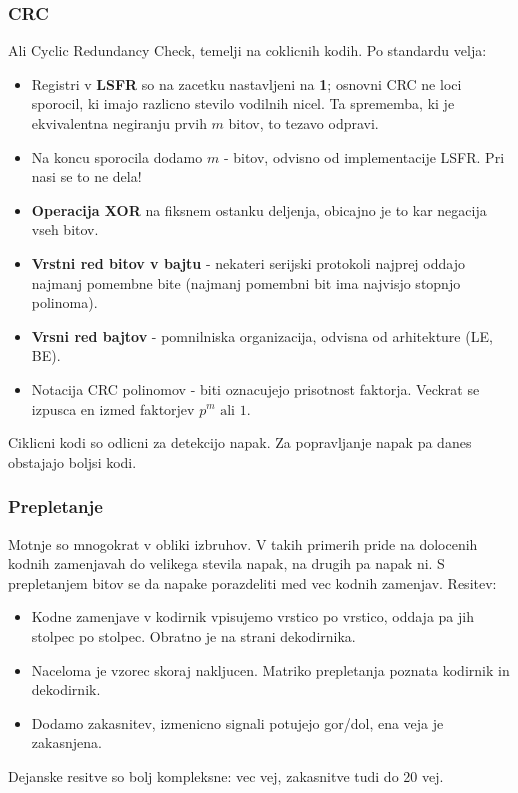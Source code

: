 \documentclass{article}
\begin{document}
\begin{multicols}{2}
	\subsubsection{CRC}
	Ali Cyclic Redundancy Check, temelji na coklicnih kodih.
	Po standardu velja:
	\begin{itemize}
		\item Registri v \textbf{LSFR} so na zacetku nastavljeni na \textbf{1}; osnovni CRC ne loci sporocil,
		      ki imajo razlicno stevilo vodilnih nicel. Ta sprememba, ki je ekvivalentna negiranju prvih $m$ bitov,
		      to tezavo odpravi.
		\item Na koncu sporocila dodamo $m$ - bitov, odvisno od implementacije LSFR. Pri nasi se to ne dela!
		\item \textbf{Operacija XOR} na fiksnem ostanku deljenja, obicajno je to kar negacija vseh bitov.
		\item \textbf{Vrstni red bitov v bajtu} - nekateri serijski protokoli najprej oddajo najmanj pomembne bite
		      (najmanj pomembni bit ima najvisjo stopnjo polinoma).
		\item \textbf{Vrsni red bajtov} - pomnilniska organizacija, odvisna od arhitekture (LE, BE).
		\item Notacija CRC polinomov - biti oznacujejo prisotnost faktorja. Veckrat se izpusca en izmed faktorjev $p^m \text{ ali } 1$.
	\end{itemize}
	Ciklicni kodi so odlicni za detekcijo napak. Za popravljanje napak pa danes obstajajo boljsi kodi.

	\subsubsection{Prepletanje}
	Motnje so mnogokrat v obliki izbruhov. V takih primerih pride na dolocenih kodnih zamenjavah do velikega stevila napak, na drugih pa napak ni.
	S prepletanjem bitov se da napake porazdeliti med vec kodnih zamenjav.
	Resitev:
	\begin{itemize}
		\item Kodne zamenjave v kodirnik vpisujemo vrstico po vrstico, oddaja pa jih stolpec po stolpec. Obratno je na strani dekodirnika.
		\item Naceloma je vzorec skoraj nakljucen. Matriko prepletanja poznata kodirnik in dekodirnik.
		\item Dodamo zakasnitev, izmenicno signali potujejo gor/dol, ena veja je zakasnjena.
	\end{itemize}
	Dejanske resitve so bolj kompleksne: vec vej, zakasnitve tudi do 20 vej.


\end{multicols}
\end{document}
